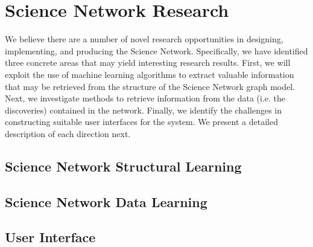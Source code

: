 \section{Science Network Research}

We believe there are a number of novel research opportunities in designing, implementing, and producing the Science Network. Specifically, we have identified three concrete areas that may yield interesting research results. First, we will exploit the use of machine learning algorithms to extract valuable information that may be retrieved from the structure of the Science Network graph model. Next, we investigate methods to retrieve information from the data (i.e. the discoveries) contained in the network.
Finally, we identify the challenges in constructing suitable user interfaces for the system. We present a detailed description of each direction next.

\subsection{Science Network Structural Learning}

\subsection{Science Network Data Learning}

\subsection{User Interface}

